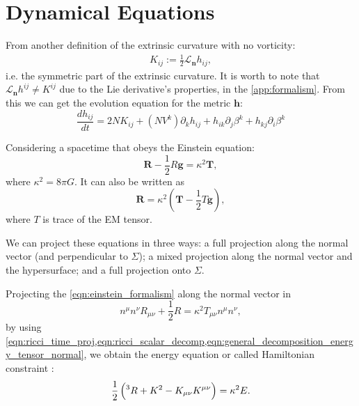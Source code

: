 \section{Dynamical Equations}


From another definition of the extrinsic curvature with no vorticity:
\begin{align}
    K_{ij} := \frac{1}{2} \mathcal{L}_{\mathbf{n}} h_{ij},
\end{align}
i.e. the symmetric part of the extrinsic curvature. It is worth to note that $\mathcal{L}_{\mathbf{n}} h^{ij} \neq K^{ij}$ due to the Lie derivative's properties, in the \cref{app:formalism}. 
From this we can get the evolution equation for the metric $\mathbf{h}$:
\begin{equation}
    \frac{d h_{ij}}{dt} = 2NK_{ij}+(NV^k) \partial_k h_{ij} + h_{ik}\partial_j \beta^k + h_{kj}\partial_i \beta^k
    \label{eqn:metric_evo_normal}
\end{equation}


Considering a spacetime that obeys the Einstein equation:
\begin{equation}
    \mathbf{R}-\frac{1}{2}R\mathbf{g}=\kappa^2 \mathbf{T},
    \label{eqn:einstein_formalism}
\end{equation}
where $\kappa^2=8\pi G$. It can also be written as
\begin{equation}
    \mathbf{R}=\kappa^2 \left(\mathbf{T}-\frac{1}{2}T\mathbf{g}\right),
    \label{eqn:einstein_equiv}
\end{equation}
where $T$ is trace of the EM tensor.

We can project these equations in three ways: a full projection along the normal vector (and perpendicular to $\Sigma$); a mixed projection along the normal vector and the hypersurface; and a full projection onto $\Sigma$.

Projecting the \cref{eqn:einstein_formalism} along the normal vector in
\begin{equation}
    n^\mu n^\nu R_{\mu\nu}+\frac{1}{2}R=\kappa^2 T_{\mu\nu}n^\mu n^\nu,
\end{equation}
by using \cref{eqn:ricci_time_proj,eqn:ricci_scalar_decomp,eqn:general_decomposition_energy_tensor_normal}, we obtain the energy equation or called Hamiltonian constraint \cite{Gourgoulhon:2012ffd}:
\begin{equation}
    \frac{1}{2}\left(\prescript{3}{}R+K^2-K_{\mu\nu}K^{\mu\nu}\right)=\kappa^2 E.
    \label{eqn:energy_equation_normal}
\end{equation}

